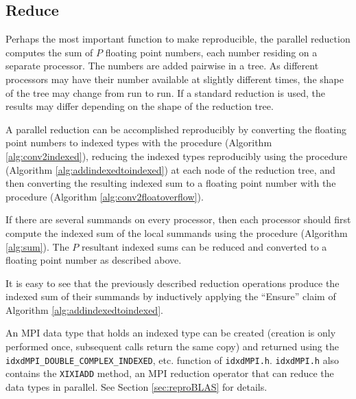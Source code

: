 \subsection{Reduce}
  \label{sec:compositeops_reduce}
  Perhaps the most important function to make reproducible, the parallel reduction computes the sum of $P$ floating point numbers, each number residing on a separate processor. The numbers are added pairwise in a tree. As different processors may have their number available at slightly different times, the shape of the tree may change from run to run. If a standard reduction is used, the results may differ depending on the shape of the reduction tree.

  A parallel reduction can be accomplished reproducibly by converting the floating point numbers to indexed types with the  procedure (Algorithm \ref{alg:conv2indexed}), reducing the indexed types reproducibly using the  procedure (Algorithm \ref{alg:addindexedtoindexed}) at each node of the reduction tree, and then converting the resulting indexed sum to a floating point number with the  procedure (Algorithm \ref{alg:conv2floatoverflow}). 

  If there are several summands on every processor, then each processor should first compute the indexed sum of the local summands using the  procedure (Algorithm \ref{alg:sum}). The $P$ resultant indexed sums can be reduced and converted to a floating point number as described above.

  It is easy to see that the previously described reduction operations produce the indexed sum of their summands by inductively applying the ``Ensure'' claim of Algorithm \ref{alg:addindexedtoindexed}.

  An MPI data type that holds an indexed type can be created (creation is only performed once, subsequent calls return the same copy) and returned using the \texttt{idxdMPI\_DOUBLE\_COMPLEX\_INDEXED}, etc. function of \texttt{idxdMPI.h}. \texttt{idxdMPI.h} also contains the \texttt{XIXIADD} method, an MPI reduction operator that can reduce the data types in parallel. See Section \ref{sec:reproBLAS} for details.

